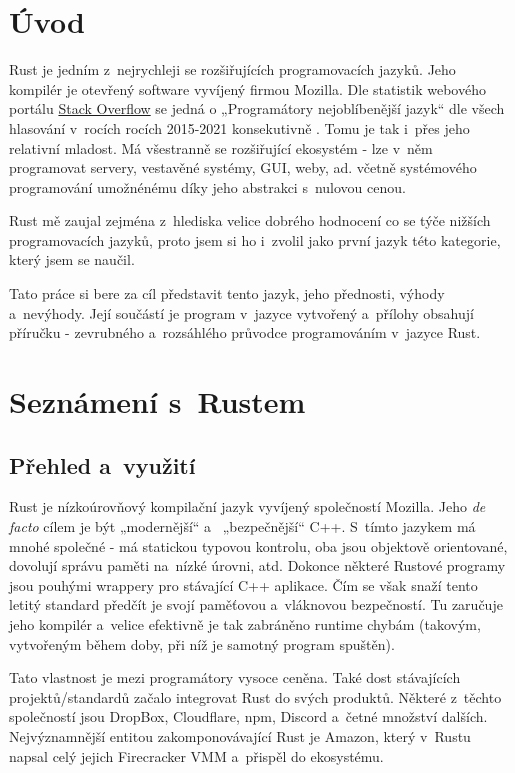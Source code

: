 \documentclass[a4paper, 12pt, twoside]{article} %
\begin{document}
\tableofcontents

\newpage


\section*{Úvod}
	Rust je jedním z~nejrychleji se rozšiřujících programovacích jazyků. Jeho kompilér je otevřený software vyvíjený firmou Mozilla. Dle statistik webového portálu \href{https://stackoverflow.com/}{Stack Overflow} se jedná o  „Programátory nejoblíbenější jazyk“ dle všech hlasování v~rocích rocích 2015-2021 konsekutivně \cite{stack}. Tomu je tak i~přes jeho relativní mladost. Má všestranně se rozšiřující ekosystém - lze v~něm programovat servery, vestavěné systémy, GUI, weby, ad. včetně systémového programování umožnénému díky jeho abstrakci s~nulovou cenou.

	Rust mě zaujal zejména z~hlediska velice dobrého hodnocení co se týče nižších programovacích jazyků, proto jsem si ho i~zvolil jako první jazyk této kategorie, který jsem se naučil.
	
	Tato práce si bere za cíl představit tento jazyk, jeho přednosti, výhody a~nevýhody. Její součástí je program v~jazyce vytvořený a~přílohy obsahují příručku - zevrubného a~rozsáhlého průvodce programováním v~jazyce Rust.

\section*{Seznámení s~Rustem}
	\subsection{Přehled a~využití}
		Rust je nízkoúrovňový kompilační jazyk vyvíjený společností Mozilla. Jeho \textit{de facto} cílem je být „modernější“ a~ „bezpečnější“ C++. S~tímto jazykem má mnohé společné - má statickou typovou kontrolu, oba jsou objektově orientované, dovolují správu paměti na~nízké úrovni, atd. Dokonce některé Rustové programy jsou pouhými wrappery pro stávající C++ aplikace. Čím se však snaží tento letitý standard předčít je svojí paměťovou a~vláknovou bezpečností. Tu zaručuje jeho kompilér a~velice efektivně je tak zabráněno runtime chybám (takovým, vytvořeným během doby, při níž je samotný program spuštěn). 

		Tato vlastnost je mezi programátory vysoce ceněna. Také dost stávajících projektů/standardů začalo integrovat Rust do svých produktů. Některé z~těchto společností jsou DropBox\cite{dropbox}, Cloudflare\cite{cloudflare}, npm\cite{npm}, Discord\cite{discord} a~četné množství dalších. Nejvýznamnější entitou zakomponovávající Rust je Amazon\cite{amazon}, který v~Rustu napsal celý jejich Firecracker VMM a~přispěl do ekosystému.
\end{document}
